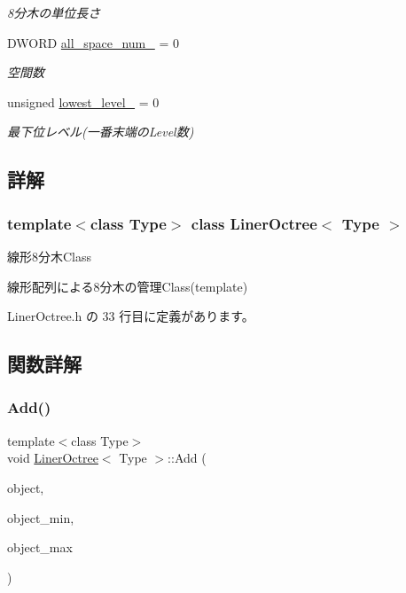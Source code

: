 \begin{DoxyCompactItemize}
$$\begin{DoxyCompactList}\small\item\em 8分木の単位長さ \end{DoxyCompactList}\item 
D\+W\+O\+RD \mbox{\hyperlink{class_liner_octree_aff1d6fcdf606bb2e42461714c0e7aa50}{all\+\_\+space\+\_\+num\+\_\+}} = 0
\begin{DoxyCompactList}\small\item\em 空間数 \end{DoxyCompactList}\item 
unsigned \mbox{\hyperlink{class_liner_octree_aa62a6ad34ceed4a8fef93123ca45350d}{lowest\+\_\+level\+\_\+}} = 0
\begin{DoxyCompactList}\small\item\em 最下位レベル(一番末端の\+Level数) \end{DoxyCompactList}\end{DoxyCompactItemize}


\subsection{詳解}
\subsubsection*{template$<$class Type$>$\newline
class Liner\+Octree$<$ Type $>$}

線形8分木\+Class 

線形配列による8分木の管理\+Class(template) 

 Liner\+Octree.\+h の 33 行目に定義があります。



\subsection{関数詳解}
\mbox{\label{class_liner_octree_ac5773a5193942a68f77a33baed9d69d4}} 
\subsubsection{\texorpdfstring{Add()}{Add()}}
{\footnotesize\ttfamily template$<$class Type$>$ \\
void \mbox{\hyperlink{class_liner_octree}{Liner\+Octree}}$<$ Type $>$\+::Add (\begin{DoxyParamCaption}\item[{\mbox{\hyperlink{class_object_of_tree}{Object\+Of\+Tree}}$<$ Type $>$ $\ast$}]{object,  }\item[{const \mbox{\hyperlink{_vector3_d_8h_ab16f59e4393f29a01ec8b9bbbabbe65d}{Vec3}} $\ast$}]{object\+\_\+min,  }\item[{const \mbox{\hyperlink{_vector3_d_8h_ab16f59e4393f29a01ec8b9bbbabbe65d}{Vec3}} $\ast$}]{object\+\_\+max }\end{DoxyParamCaption})\hspace{0.3cm}{\ttfamily [inline]}}



